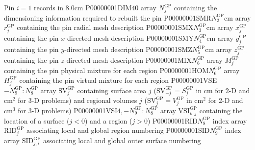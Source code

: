 \begin{DescriptionEnregistrement}{Pin $i=1$ records in }{8.0cm}\label{tabl:NXTCluster}
\IntEnr
  {P00000001DIM}{$40$}
  {array $N^{\text{GP}}_{j}$ containing the dimensioning information required to rebuilt the pin} 
\DbleEnr
  {P00000001SMR}{$N^{\text{GP}}_{2}$}{cm}
  {array $r^{\text{GP}}_{j}$ containing the pin radial mesh description}
\DbleEnr
  {P00000001SMX}{$N^{\text{GP}}_{3}$}{cm}
  {array $x^{\text{GP}}_{j}$ containing the pin $x$-directed mesh description}
\DbleEnr
  {P00000001SMY}{$N^{\text{GP}}_{4}$}{cm}
  {array $y^{\text{GP}}_{j}$ containing the pin $y$-directed mesh description}
\DbleEnr
  {P00000001SMZ}{$N^{\text{GP}}_{5}$}{cm}
  {array $z^{\text{GP}}_{j}$ containing the pin $z$-directed mesh description}
\IntEnr
  {P00000001MIX}{$N^{\text{GP}}_{6}$}
  {array $M^{\text{GP}}_{j}$ containing the pin physical mixture for each region}
\IntEnr
  {P00000001HOM}{$N^{\text{GP}}_{6}$}
  {array $H^{\text{GP}}_{j}$ containing the pin virtual mixture for each region}
\DbleEnr
  {P00000001VSE}{$-N^{\text{GP}}_{9}:N^{\text{GP}}_{8}$}{}
  {array $\text{SV}^{\text{GP}}_{j}$ containing surface area $j$ ($\text{SV}^{\text{GP}}_{-j}=S^{\text{GP}}_{j}$ in cm for 2-D and cm$^{2}$ for 3-D problems) and
regional volumes $j$ ($\text{SV}^{\text{GP}}_{j}=V^{\text{GP}}_{j}$ in cm$^{2}$ for 2-D and cm$^{3}$ for 3-D problems)}
\IntEnr
  {P00000001VSI}{$4,-N^{\text{GP}}_{9}:N^{\text{GP}}_{8}$}
  {array $\text{VSI}^{\text{GP}}_{k,j}$ containing the location of a surface ($j<0$) and a region ($j>0$)}
\IntEnr
  {P00000001RID}{$N^{\text{GP}}_{8}$}
  {index array $\text{RID}^{\text{GP}}_{j}$ associating local and global region numbering}
\IntEnr
  {P00000001SID}{$N^{\text{GP}}_{9}$}
  {index array $\text{SID}^{\text{GP}}_{j,i}$ associating local and global outer surface numbering}
\end{DescriptionEnregistrement}

